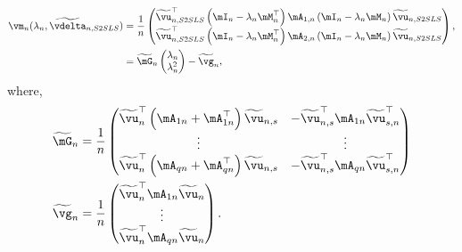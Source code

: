 \documentclass[english,12pt]{book}\usepackage[]{graphicx}\usepackage[]{xcolor}
\begin{document}
\begin{equation}\label{eq:momdent_conditions_step}
	\begin{aligned}
		\vm_n(\lambda_n,\widetilde{\vdelta}_{n, S2SLS}) & = \frac{1}{n}
		\begin{pmatrix}
		\widetilde{\vu}_{n, S2SLS}^\top \left(\mI_n - \lambda_n\mM^\top_n\right)\mA_{1,n}\left(\mI_n - \lambda_n\mM_n\right)\widetilde{\vu}_{n, S2SLS} \\
		\widetilde{\vu}_{n, S2SLS}^\top \left(\mI_n - \lambda_n\mM^\top_n\right)\mA_{2,n}\left(\mI_n - \lambda_n\mM_n\right)\widetilde{\vu}_{n, S2SLS}
		\end{pmatrix}, \\
		& = \widetilde{\mG}_n\begin{pmatrix} \lambda_n \\
                \lambda^2_n
\end{pmatrix} - \widetilde{\vg}_n,
	\end{aligned}
\end{equation}
%
where,
\begin{equation*}
\begin{aligned}
\widetilde{\mG}_n & = \frac{1}{n}
                    \begin{pmatrix}
                      \widetilde{\vu}^\top_n\left(\mA_{1n} + \mA^\top_{1n}\right)\widetilde{\vu}_{n,s} & - \widetilde{\vu}^\top_{n,s}\mA_{1n}\widetilde{\vu}^\top_{s,n} \\
                      \vdots & \vdots \\
                      \widetilde{\vu}^\top_n\left(\mA_{qn} + \mA^\top_{qn}\right)\widetilde{\vu}_{n,s} & - \widetilde{\vu}^\top_{n,s}\mA_{qn}\widetilde{\vu}^\top_{s,n}
                    \end{pmatrix} \\
\widetilde{\vg}_n & = \frac{1}{n}\begin{pmatrix}
                                \widetilde{\vu}^\top_n\mA_{1n}\widetilde{\vu}_n \\
                                \vdots \\
                                \widetilde{\vu}^\top_n\mA_{qn}\widetilde{\vu}_n
                                \end{pmatrix}.
\end{aligned}
\end{equation*}
\end{document}
